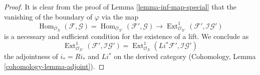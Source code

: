 \documentclass[10pt,a4paper]{amsart}
\theoremstyle{plain}
\theoremstyle{definition}
\theoremstyle{remark}
\numberwithin{equation}{subsection}
\def\Hom{\mathop{\mathrm{Hom}}\nolimits}
\def\Ext{\mathop{\mathrm{Ext}}\nolimits}
\begin{document}
\begin{proof}
It is clear from the proof of Lemma \ref{lemma-inf-map-special} that the
vanishing of the boundary of $\varphi$ via the map
$$
\Hom_{\mathcal{O}_X}(\mathcal{F}, \mathcal{G}) =
\Hom_{\mathcal{O}_{X'}}(\mathcal{F}', \mathcal{G}) \longrightarrow
\Ext^1_{\mathcal{O}_{X'}}(\mathcal{F}', \mathcal{I}\mathcal{G}')
$$
is a necessary and sufficient condition for the existence of a lift. We
conclude as
$$
\Ext^1_{\mathcal{O}_{X'}}(\mathcal{F}', \mathcal{I}\mathcal{G}') =
\Ext^1_{\mathcal{O}_X}(Li^*\mathcal{F}', \mathcal{I}\mathcal{G}')
$$
the adjointness of $i_* = Ri_*$ and $Li^*$ on the derived category
(Cohomology, Lemma \ref{cohomology-lemma-adjoint}).
\end{proof}
\end{document}
